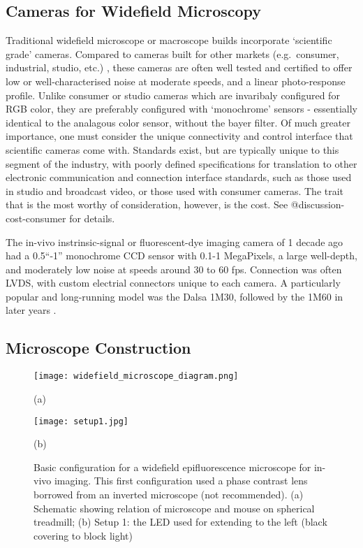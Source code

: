 \documentclass[../main.tex]{subfiles}
\begin{document}
\subsection{
	Cameras for Widefield Microscopy}\label{sec:cameras-for-widefield-microscopy}

Traditional widefield microscope or macroscope builds incorporate `scientific grade' cameras.
Compared to cameras built for other markets (e.g.~consumer, industrial, studio, etc.)
, these cameras are often well
tested and certified to offer low or well-characterised noise at
moderate speeds, and a linear photo-response profile.
Unlike consumer or studio cameras which are invaribaly configured for RGB color, they are preferably configured with `monochrome' sensors - essentially identical to the analagous color sensor, without the bayer filter.
Of much greater importance, one must consider the unique connectivity and control interface that scientific cameras come with.
Standards exist, but are typically unique to this segment of the industry, with poorly defined specifications for translation to other electronic communication and connection interface standards, such as those used in studio and broadcast video, or those used with consumer cameras.
The trait that is the most worthy of consideration, however, is the cost.
See @discussion-cost-consumer for details.

The in-vivo instrinsic-signal or fluorescent-dye imaging camera of 1 decade ago had a 0.5``-1'' monochrome CCD sensor with 0.1-1 MegaPixels, a large well-depth, and moderately low noise at speeds around 30 to 60 fps.
Connection was often LVDS, with custom electrial connectors unique to each camera.
A particularly popular and long-running model was the Dalsa 1M30, followed by the 1M60 in later years \cite{takahashi_vivo_2006}.

\subsection{
	Microscope Construction}\label{sec:microscope-construction}

\begin{figure}[htb]
	\begin{minipage}[t]{0.49\linewidth}\centering \texttt{[image: widefield\_microscope\_diagram.png]} \medskip \centerline{(a)}
	\end{minipage}
	\hfill
	\begin{minipage}[t]{0.49\linewidth}\centering \texttt{[image: setup1.jpg]} \medskip \centerline{(b)}
	\end{minipage}
	\caption{Basic configuration for a widefield epifluorescence microscope for in-vivo imaging.
		This first configuration used a phase contrast lens borrowed from an inverted microscope (not recommended).
		(a) Schematic showing relation of microscope and mouse on spherical treadmill; (b) Setup 1: the LED used for extending to the left (black covering to block light)}
	\label{fig:Sampling}
\end{figure}
\end{document}
